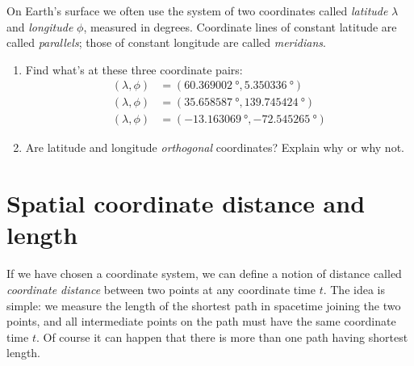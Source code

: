 \documentclass[a4paper,12pt,%
onecolumn,oneside,%
british%
]{memoir}
\renewcommand*{\|}[1][]{\nonscript\:#1\vert\nonscript\:\mathopen{}}
\begin{document}
\begin{exercise}[label={ex:latlong}]
  On Earth's surface we often use the system of two coordinates called \emph{latitude} $\lambda$ and \emph{longitude} $\phi$, measured in degrees. Coordinate lines of constant latitude are called \emph{parallels}; those of constant longitude are called \emph{meridians}.

  \begin{enumerate}[exerc]
  \item Find what's at these three coordinate pairs:
    \begin{equation*}
      \begin{aligned}
        (\lambda, \phi) &= (\qty{60.369002}{\degree}, \qty{5.350336}{\degree})
        \\
        (\lambda, \phi) &= (\qty{35.658587}{\degree}, \qty{139.745424}{\degree})
        \\
        (\lambda, \phi) &= (\qty{-13.163069}{\degree}, \qty{-72.545265}{\degree})
      \end{aligned}
    \end{equation*}

  \item Are latitude and longitude \emph{orthogonal} coordinates? Explain why or why not.
  \end{enumerate}
\end{exercise}


\section{Spatial coordinate distance and length}
\label{sec:coord_distance}

If we have chosen a coordinate system, we can define a notion of distance called
\emph{coordinate distance} between two points %
at any coordinate time $t$. The idea is simple: we measure the length of the shortest path in spacetime joining the two points, and all intermediate points on the path must have the same coordinate time $t$. Of course it can happen that there is more than one path having shortest length.
\end{document}
